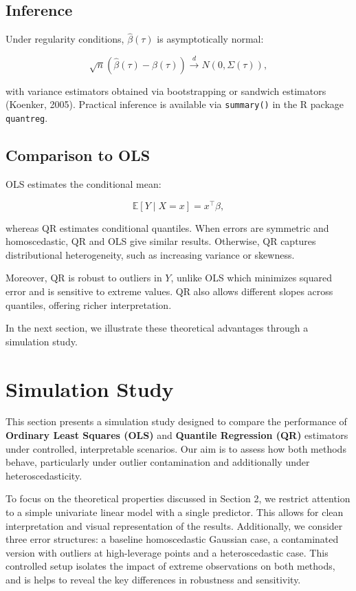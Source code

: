 \documentclass[fleqn,10pt]{latex/stylish_article} %
\begin{document}
\subsection{Inference}\label{inference}

Under regularity conditions, \(\hat\beta(\tau)\) is asymptotically normal:

\[
\sqrt{n}(\hat\beta(\tau) - \beta(\tau)) \overset{d}{\to} N(0, \Sigma(\tau)),
\]

with variance estimators obtained via bootstrapping or sandwich estimators (Koenker, 2005). Practical inference is available via \texttt{summary()} in the R package \texttt{quantreg}.

\subsection{Comparison to OLS}\label{comparison-to-ols}

OLS estimates the conditional mean:

\[
\mathbb{E}[Y \mid X = x] = x^\top \beta,
\]

whereas QR estimates conditional quantiles. When errors are symmetric and homoscedastic, QR and OLS give similar results. Otherwise, QR captures distributional heterogeneity, such as increasing variance or skewness.

Moreover, QR is robust to outliers in \(Y\), unlike OLS which minimizes squared error and is sensitive to extreme values. QR also allows different slopes across quantiles, offering richer interpretation.

In the next section, we illustrate these theoretical advantages through a simulation study.

\section{Simulation Study}\label{simulation-study}

This section presents a simulation study designed to compare the performance of \textbf{Ordinary Least Squares (OLS)} and \textbf{Quantile Regression (QR)} estimators under controlled, interpretable scenarios. Our aim is to assess how both methods behave, particularly under outlier contamination and additionally under heteroscedasticity.

To focus on the theoretical properties discussed in Section 2, we restrict attention to a simple univariate linear model with a single predictor. This allows for clean interpretation and visual representation of the results. Additionally, we consider three error structures: a baseline homoscedastic Gaussian case, a contaminated version with outliers at high-leverage points and a heteroscedastic case. This controlled setup isolates the impact of extreme observations on both methods, and is helps to reveal the key differences in robustness and sensitivity.
\end{document}
